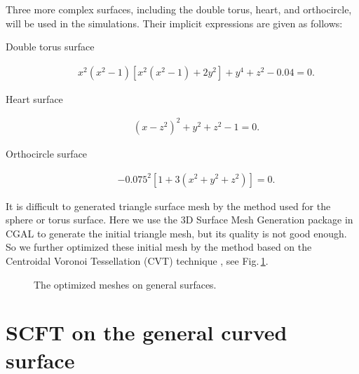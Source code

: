 \documentclass[final,1p,times]{elsarticle}
\begin{document}
Three more complex surfaces, including the double torus, heart, and
orthocircle, will be used in the simulations. Their
implicit expressions are given as follows:
\begin{description}
    \item[Double torus surface] 
        \begin{align}
            x^2(x^2-1)[x^2(x^2-1) + 2y^2] + y^4+ z^2 -0.04 =0.
            \label{fig:mesh:doubletorus}
        \end{align}
    \item[Heart surface] 
        \begin{align}
            (x-z^2)^2 +y^2+z^2-1=0.
            \label{fig:mesh:heart}
        \end{align}
    \item[Orthocircle surface]
        \begin{align}
            [(x^2+y^2-1)^2+z^2][(y^2+z^2-1)^2+x^2][(z^2+x^2-1)^2+y^2]-0.075^2[1+3(x^2+y^2+z^2)]=0.
            \label{fig:mesh:orthocircle}
        \end{align}
\end{description}

It is difficult to generated triangle surface mesh by
the method used for the sphere or torus surface. Here we use the 3D Surface Mesh
Generation package in CGAL \cite{rieau2018} to generate the initial triangle
mesh, but its quality is not good enough. So we further optimized these
initial mesh by the method based on the Centroidal Voronoi Tessellation (CVT)
technique \cite{wei2012}, see Fig.\,\ref{fig:mesh-CGAL}. 

\begin{figure}[H]
    \setlength{\captionmargin}{2pt}
    \centering
    \hspace{1cm}    
    \hspace{1cm}
    \caption{The optimized meshes on general surfaces.}
    \label{fig:mesh-CGAL}
\end{figure}

\section{SCFT on the general curved surface}
\label{sec:scft}
\end{document}
